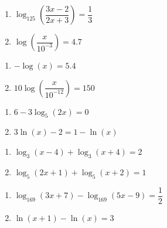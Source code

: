 \begin{multicols}{2}
\begin{enumerate}
\setcounter{enumi}{\value{HW}}

\item $\log_{125} \left(\dfrac{3x-2}{2x+3}\right)=\dfrac{1}{3}$

\item $\log\left(\dfrac{x}{10^{-3}}\right) = 4.7$  \label{sixfourRichterequ}


\setcounter{HW}{\value{enumi}}
\end{enumerate}
\end{multicols}


\begin{multicols}{2}
\begin{enumerate}
\setcounter{enumi}{\value{HW}}

\item $-\log(x) = 5.4$  \label{sixfourpHequ}
\item $10\log\left(\dfrac{x}{10^{-12}}\right) = 150$ \label{sixfourdecibelequ}

\setcounter{HW}{\value{enumi}}
\end{enumerate}
\end{multicols}

\begin{multicols}{2}
\begin{enumerate}
\setcounter{enumi}{\value{HW}}

\item $6-3\log_{5}(2x)=0$
\item $3\ln(x)-2=1-\ln(x)$

\setcounter{HW}{\value{enumi}}
\end{enumerate}
\end{multicols}

\begin{multicols}{2}
\begin{enumerate}
\setcounter{enumi}{\value{HW}}

\item $\log_{3}(x - 4) + \log_{3}(x + 4) = 2$

\item $\log_{5}(2x + 1) + \log_{5}(x + 2) = 1$

\setcounter{HW}{\value{enumi}}
\end{enumerate}
\end{multicols}

\begin{multicols}{2}
\begin{enumerate}
\setcounter{enumi}{\value{HW}}

\item $\log_{169}(3x + 7) - \log_{169}(5x - 9) = \dfrac{1}{2}$

\item $\ln(x+1) - \ln(x) = 3$ 

\setcounter{HW}{\value{enumi}}
\end{enumerate}
\end{multicols}

